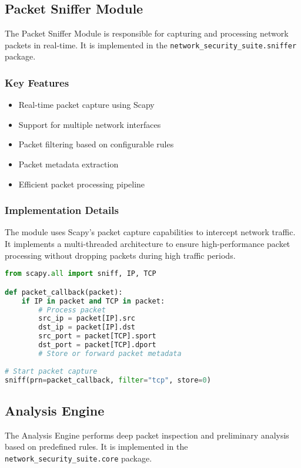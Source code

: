 \subsection{Packet Sniffer Module}
The Packet Sniffer Module is responsible for capturing and processing network packets in real-time. It is implemented in the \texttt{network\_security\_suite.sniffer} package.

\subsubsection{Key Features}
\begin{itemize}
    \item Real-time packet capture using Scapy
    \item Support for multiple network interfaces
    \item Packet filtering based on configurable rules
    \item Packet metadata extraction
    \item Efficient packet processing pipeline
\end{itemize}

\subsubsection{Implementation Details}
The module uses Scapy's packet capture capabilities to intercept network traffic. It implements a multi-threaded architecture to ensure high-performance packet processing without dropping packets during high traffic periods.

\begin{lstlisting}[language=Python, caption=Example Packet Capture Code]
from scapy.all import sniff, IP, TCP

def packet_callback(packet):
    if IP in packet and TCP in packet:
        # Process packet
        src_ip = packet[IP].src
        dst_ip = packet[IP].dst
        src_port = packet[TCP].sport
        dst_port = packet[TCP].dport
        # Store or forward packet metadata
        
# Start packet capture
sniff(prn=packet_callback, filter="tcp", store=0)
\end{lstlisting}

\subsection{Analysis Engine}
The Analysis Engine performs deep packet inspection and preliminary analysis based on predefined rules. It is implemented in the \texttt{network\_security\_suite.core} package.


